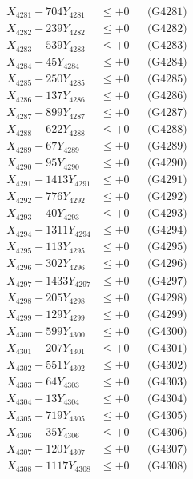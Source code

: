 \documentclass[a4paper,10pt]{article}
\begin{document}
{\begin{align}
\allowbreak
X_{4281} - 704Y_{4281} &\leq +0 && \text{(G4281)} \\
X_{4282} - 239Y_{4282} &\leq +0 && \text{(G4282)} \\
X_{4283} - 539Y_{4283} &\leq +0 && \text{(G4283)} \\
X_{4284} - 45Y_{4284} &\leq +0 && \text{(G4284)} \\
X_{4285} - 250Y_{4285} &\leq +0 && \text{(G4285)} \\
X_{4286} - 137Y_{4286} &\leq +0 && \text{(G4286)} \\
X_{4287} - 899Y_{4287} &\leq +0 && \text{(G4287)} \\
X_{4288} - 622Y_{4288} &\leq +0 && \text{(G4288)} \\
X_{4289} - 67Y_{4289} &\leq +0 && \text{(G4289)} \\
X_{4290} - 95Y_{4290} &\leq +0 && \text{(G4290)} \\
\allowbreak
X_{4291} - 1413Y_{4291} &\leq +0 && \text{(G4291)} \\
X_{4292} - 776Y_{4292} &\leq +0 && \text{(G4292)} \\
X_{4293} - 40Y_{4293} &\leq +0 && \text{(G4293)} \\
X_{4294} - 1311Y_{4294} &\leq +0 && \text{(G4294)} \\
X_{4295} - 113Y_{4295} &\leq +0 && \text{(G4295)} \\
X_{4296} - 302Y_{4296} &\leq +0 && \text{(G4296)} \\
X_{4297} - 1433Y_{4297} &\leq +0 && \text{(G4297)} \\
X_{4298} - 205Y_{4298} &\leq +0 && \text{(G4298)} \\
X_{4299} - 129Y_{4299} &\leq +0 && \text{(G4299)} \\
X_{4300} - 599Y_{4300} &\leq +0 && \text{(G4300)} \\
\allowbreak
X_{4301} - 207Y_{4301} &\leq +0 && \text{(G4301)} \\
X_{4302} - 551Y_{4302} &\leq +0 && \text{(G4302)} \\
X_{4303} - 64Y_{4303} &\leq +0 && \text{(G4303)} \\
X_{4304} - 13Y_{4304} &\leq +0 && \text{(G4304)} \\
X_{4305} - 719Y_{4305} &\leq +0 && \text{(G4305)} \\
X_{4306} - 35Y_{4306} &\leq +0 && \text{(G4306)} \\
X_{4307} - 120Y_{4307} &\leq +0 && \text{(G4307)} \\
X_{4308} - 1117Y_{4308} &\leq +0 && \text{(G4308)} \\

\end{align}}
\end{document}
